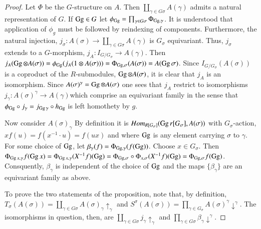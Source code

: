 \begin{proof}
Let $\Phi$ be the $G$-structure on $A$. Then $\coprod_{\gamma \in G\sigma} A(\gamma)$ admits a natural representation of $G$. If $\operatorname{Gg} \in G$  let $\phi_{\operatorname{Gg}} = \prod_{\gamma \in G\sigma} \Phi_{\operatorname{Gg},\gamma}$. It is understood that application of $\phi_{g}$ must be followed by reindexing of components. Furthermore, the natural injection, $j_{\sigma} : A(\sigma) \rightarrow \coprod_{\gamma \in G\sigma} A(\gamma)$ is $G_{\sigma}$ equivariant. Thus, $j_{\sigma}$ extends to a $G$-morphism, $j_{A} : I_{G/G_{\sigma}} \rightarrow A(\gamma)$. Then $j_{A}(\operatorname{Gg} \otimes A(\sigma)) = \phi_{\operatorname{Gg}}(j_{A}(1 \otimes A(\sigma))) =\Phi_{\operatorname{Gg}, \sigma}(A(\sigma))= A(\operatorname{Gg}\sigma)$. Since $I_{G/G_{\sigma}}(A(\sigma))$ is a coproduct of the $R$-submodules, $\operatorname{Gg} \otimes A(\sigma)$, it is clear that $j_{A}$ is an isomorphism. Since $A(\sigma)^{\gamma} = \operatorname{Gg} \otimes A(\sigma)$ one sees that $j_{A}$ restrict to isomorphisms $j_{\gamma} : A(\sigma)^{\gamma} \rightarrow A(\gamma)$\pageoriginale which comprise an equivariant family in the sense that $\phi_{\operatorname{Gg}} \circ j_{\gamma} = j_{\operatorname{Gg} \gamma} \circ h_{\operatorname{Gg}}$ is left homothety by $g$.

Now consider $A(\sigma)_{\gamma}$ By definition it is $Hom_{R[G_{\sigma}]}(\operatorname{Gg} r[G_{\sigma}], A(\sigma))$ with $G_{\sigma}$-action, $xf(u) = f(x^{-1} \cdot u) = f(ux)$ and where $\operatorname{Gg}$ is any element carrying $\sigma$ to $\gamma$. For some choice of $\operatorname{Gg}$, let $\beta_{\gamma}(f) = \Phi_{\operatorname{Gg}, \gamma}(f(\operatorname{Gg}))$. Choose $x\in G_{\sigma}$. Then  $\Phi_{\operatorname{Gg} x, \gamma}f(\operatorname{Gg} x) = \Phi_{\operatorname{Gg} x, \gamma}(X^{-1} f)(\operatorname{Gg}) = \Phi_{\operatorname{Gg}, \sigma} \circ \Phi_{x, \sigma}(X^{-1} f)(\operatorname{Gg}) = \Phi_{\operatorname{Gg}, \sigma}f(\operatorname{Gg})$. Consquently, $\beta_{\gamma}$ is independent of the choice of $\operatorname{Gg}$ and the maps $\{\beta_{\gamma}\}$ are an equivariant family as above.

To prove the two statements of the proposition, note that, by definition, $T_{\sigma}(A(\sigma))= \coprod_{\gamma \in G\sigma} A(\sigma)_{\gamma} \uparrow_{\gamma}$ and $S^{\sigma}(A(\sigma)) = \prod_{\gamma \in G_{\sigma}}A(\sigma)^{\gamma} \downarrow^{\gamma}$. The isomorphisms in question, then, are $\coprod_{\gamma \in G\sigma}j_{\gamma} \uparrow_{\gamma}$ and $\prod_{\gamma \in G\sigma}\beta_{\gamma}\downarrow^{\gamma}$.
\end{proof}

